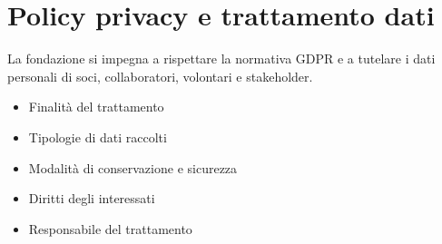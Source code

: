 
\section*{Policy privacy e trattamento dati}

La fondazione si impegna a rispettare la normativa GDPR e a tutelare i dati personali di soci, collaboratori, volontari e stakeholder.

\begin{itemize}
  \item Finalità del trattamento
  \item Tipologie di dati raccolti
  \item Modalità di conservazione e sicurezza
  \item Diritti degli interessati
  \item Responsabile del trattamento
\end{itemize}

